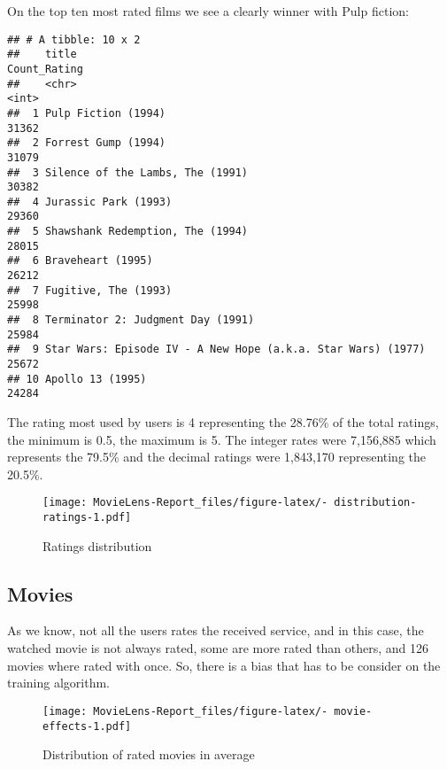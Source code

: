 \documentclass[
]{article}
\begin{document}
On the top ten most rated films we see a clearly winner with Pulp
fiction:

\begin{verbatim}
## # A tibble: 10 x 2
##    title                                                        Count_Rating
##    <chr>                                                               <int>
##  1 Pulp Fiction (1994)                                                 31362
##  2 Forrest Gump (1994)                                                 31079
##  3 Silence of the Lambs, The (1991)                                    30382
##  4 Jurassic Park (1993)                                                29360
##  5 Shawshank Redemption, The (1994)                                    28015
##  6 Braveheart (1995)                                                   26212
##  7 Fugitive, The (1993)                                                25998
##  8 Terminator 2: Judgment Day (1991)                                   25984
##  9 Star Wars: Episode IV - A New Hope (a.k.a. Star Wars) (1977)        25672
## 10 Apollo 13 (1995)                                                    24284
\end{verbatim}

The rating most used by users is 4 representing the 28.76\% of the total
ratings, the minimum is 0.5, the maximum is 5. The integer rates were
7,156,885 which represents the 79.5\% and the decimal ratings were
1,843,170 representing the 20.5\%.

\begin{figure}
\centering
\texttt{[image: MovieLens-Report\_files/figure-latex/- distribution-ratings-1.pdf]}
\caption{Ratings distribution}
\end{figure}

\hypertarget{movies}{%
\subsection{Movies}\label{movies}}

As we know, not all the users rates the received service, and in this
case, the watched movie is not always rated, some are more rated than
others, and 126 movies where rated with once. So, there is a bias that
has to be consider on the training algorithm.

\begin{figure}
\centering
\texttt{[image: MovieLens-Report\_files/figure-latex/- movie-effects-1.pdf]}
\caption{Distribution of rated movies in average}
\end{figure}
\end{document}
